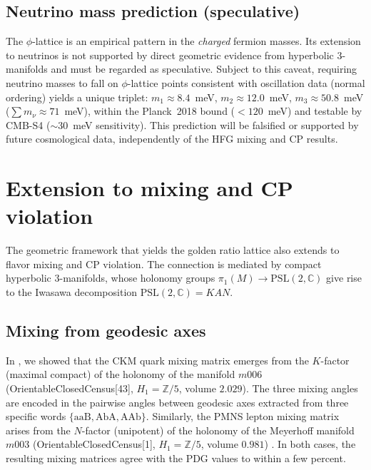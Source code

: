 ﻿\documentclass[12pt]{article}
\theoremstyle{definition}
\begin{document}
\subsection{Neutrino mass prediction (speculative)}
\label{subsec:neutrino_brief}

The $\phi$-lattice is an empirical pattern in the \emph{charged}
fermion masses. Its extension to neutrinos is not supported by
direct geometric evidence from hyperbolic 3-manifolds and must
be regarded as speculative. Subject to this caveat, requiring
neutrino masses to fall on $\phi$-lattice points consistent
with oscillation data (normal ordering) yields a unique triplet:
$m_1\approx8.4$~meV, $m_2\approx12.0$~meV, $m_3\approx50.8$~meV
($\sum m_\nu\approx71$~meV), within the Planck~2018 bound
($<120$~meV) and testable by CMB-S4 ($\sim30$~meV sensitivity).
This prediction will be falsified or supported by future
cosmological data, independently of the HFG mixing and CP results.

\section{Extension to mixing and CP violation}




\label{sec:mixing_cp}

The geometric framework that yields the golden ratio lattice also extends to flavor mixing and CP violation. The connection is mediated by compact hyperbolic 3-manifolds, whose holonomy groups $\pi_1(M)\to\mathrm{PSL}(2,\mathbb{C})$ give rise to the Iwasawa decomposition $\mathrm{PSL}(2,\mathbb{C}) = KAN$.

\subsection{Mixing from geodesic axes}
In \cite{Gentry:CKM}, we showed that the CKM quark mixing matrix emerges from the $K$-factor (maximal compact) of the holonomy of the manifold $m006$ (OrientableClosedCensus[43], $H_1=\mathbb{Z}/5$, volume $2.029$). The three mixing angles are encoded in the pairwise angles between geodesic axes extracted from three specific words $\{\mathrm{aaB},\mathrm{AbA},\mathrm{AAb}\}$. Similarly, the PMNS lepton mixing matrix arises from the $N$-factor (unipotent) of the holonomy of the Meyerhoff manifold $m003$ (OrientableClosedCensus[1], $H_1=\mathbb{Z}/5$, volume $0.981$) \cite{Gentry:PMNS}. In both cases, the resulting mixing matrices agree with the PDG values to within a few percent.
\end{document}
